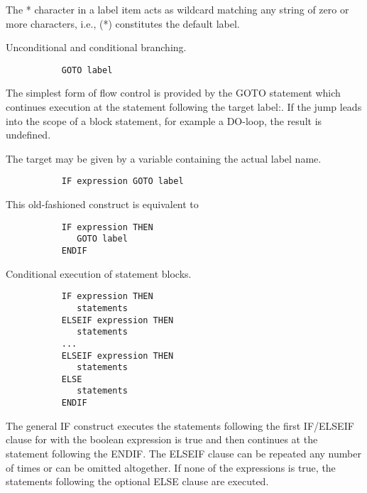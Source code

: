    \par
The \DQUOTE{}*\DQUOTE{} character in a label item acts as wildcard matching 
   any string of zero or more characters, i.e., \DQUOTE{}(*)\DQUOTE{} 
   constitutes the default label.  

\ENDCMD


   \par
Unconditional and conditional branching.  

\begin{verbatim}
           GOTO label
\end{verbatim}
\ENDVERB
   \par
The simplest form of flow control is provided by the GOTO statement which 
   continues execution at the statement following the target 
   \DQUOTE{}label:\DQUOTE{}. If the jump leads into the scope of a block 
   statement, for example a DO-loop, the result is undefined.  

   \par
The target may be given by a variable containing the actual label name.  

\begin{verbatim}
           IF expression GOTO label
\end{verbatim}
\ENDVERB
   \par
This old-fashioned construct is equivalent to 

\begin{verbatim}
           IF expression THEN
              GOTO label
           ENDIF
\end{verbatim}

\ENDCMD


   \par
Conditional execution of statement blocks.  

\begin{verbatim}
           IF expression THEN
              statements
           ELSEIF expression THEN
              statements
           ...
           ELSEIF expression THEN
              statements
           ELSE
              statements
           ENDIF
\end{verbatim}
\ENDVERB
   \par
The general IF construct executes the statements following the first 
   IF/ELSEIF clause for with the boolean expression is true and then continues 
   at the statement following the ENDIF. The ELSEIF clause can be repeated any 
   number of times or can be omitted altogether. If none of the expressions is 
   true, the statements following the optional ELSE clause are executed.  

